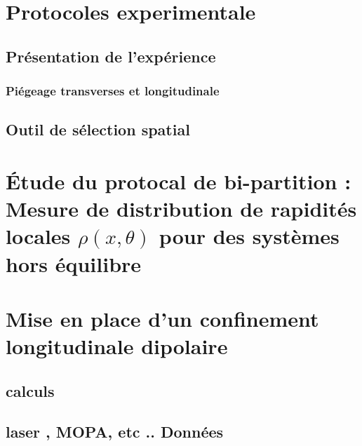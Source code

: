 \chapter{Protocoles experimentale}
\minitoc
\section{Présentation de l’expérience}

\subsection{Piégeage transverses et longitudinale}
\section{Outil de sélection spatial}


\chapter{Étude du protocal de bi-partition : Mesure de distribution de rapidités locales $\rho(x , \theta ) $  pour des systèmes hors équilibre}
\minitoc


\chapter{Mise en place d'un confinement longitudinale dipolaire}
\minitoc
\section{calculs}
\section{laser , MOPA, etc .. Données}


\newpage
\printindex
\printindex[pers]
			            
